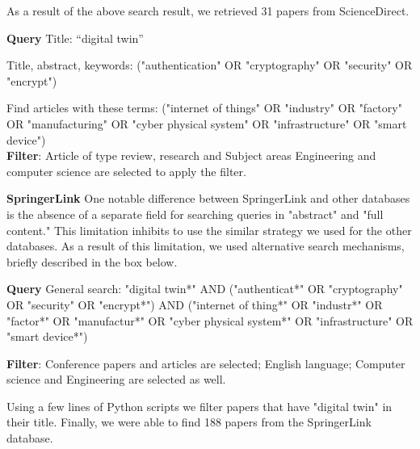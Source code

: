 As a result of the above search result, we retrieved 31 papers from ScienceDirect. 

\begin{tcolorbox}[colback=black!5!white, sharp corners=all, colframe=white!95!black]
\textbf{Query}
\tcblower
Title: “digital twin”

Title, abstract, keywords: ("authentication" OR "cryptography" OR "security" OR "encrypt")

Find articles with these terms: ("internet of things" OR "industry" OR "factory" OR "manufacturing" OR "cyber physical system" OR "infrastructure" OR "smart device")
\\

\textbf{Filter}: Article of type review, research and Subject areas Engineering and computer science are selected to apply the filter.

\end{tcolorbox}


\textbf{SpringerLink}
One notable difference between SpringerLink and other databases is the absence of a separate field for searching queries in "abstract" and "full content." This limitation inhibits to use the similar strategy we used for the other databases. 
As a result of this limitation, we used alternative search mechanisms, briefly described in the box below.

\begin{tcolorbox}[colback=black!5!white, sharp corners=all, colframe=white!95!black]
\textbf{Query}
General search: "digital twin*" AND ("authenticat*" OR "cryptography" OR "security" OR "encrypt*") AND ("internet of thing*" OR "industr*" OR "factor*" OR "manufactur*" OR "cyber physical system*" OR "infrastructure" OR "smart device*") 

\tcblower
\textbf{Filter}: Conference papers and articles are selected; English language; Computer science and Engineering are selected as well. 

Using a few lines of Python scripts we filter papers that have "digital twin" in their title. Finally, we were able to find 188 papers from the SpringerLink database. 

\end{tcolorbox}

